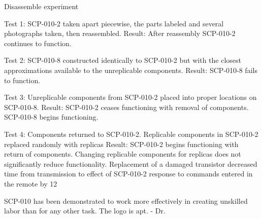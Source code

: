  Disassemble experiment

Test 1: SCP-010-2 taken apart piecewise, the parts labeled and several photographs taken, then reassembled.
Result: After reassembly SCP-010-2 continues to function.

Test 2: SCP-010-8 constructed identically to SCP-010-2 but with the closest approximations available to the unreplicable components.
Result: SCP-010-8 fails to function.

Test 3: Unreplicable components from SCP-010-2 placed into proper locations on SCP-010-8.
Result: SCP-010-2 ceases functioning with removal of components. SCP-010-8 begins functioning.

Test 4: Components returned to SCP-010-2. Replicable components in SCP-010-2 replaced randomly with replicas
Result: SCP-010-2 begins functioning with return of components. Changing replicable components for replicas does not significantly reduce functionality. Replacement of a damaged transistor decreased time from transmission to effect of SCP-010-2 response to commands entered in the remote by 12%


SCP-010 has been demonstrated to work more effectively in creating unskilled labor than for any other task. The logo is apt. - Dr. 